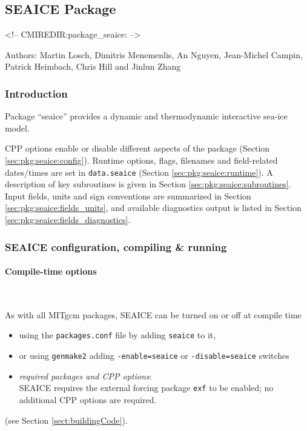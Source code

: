 


\subsection{SEAICE Package}
\label{sec:pkg:seaice}
\begin{rawhtml}
<!-- CMIREDIR:package_seaice: -->
\end{rawhtml}

Authors: Martin Losch, Dimitris Menemenlis, An Nguyen, Jean-Michel Campin,
Patrick Heimbach, Chris Hill and Jinlun Zhang

\subsubsection{Introduction
\label{sec:pkg:exf:intro}}


Package ``seaice'' provides a dynamic and thermodynamic interactive
sea-ice model. 

CPP options enable or disable different aspects of the package
(Section \ref{sec:pkg:seaice:config}).
Runtime options, flags, filenames and field-related dates/times are
set in \texttt{data.seaice}
(Section \ref{sec:pkg:seaice:runtime}).
A description of key subroutines is given in Section
\ref{sec:pkg:seaice:subroutines}.
Input fields, units and sign conventions are summarized in
Section \ref{sec:pkg:seaice:fields_units}, and available diagnostics
output is listed in Section \ref{sec:pkg:seaice:fields_diagnostics}.


\subsubsection{SEAICE configuration, compiling \& running}

\paragraph{Compile-time options
\label{sec:pkg:seaice:config}}
~

As with all MITgcm packages, SEAICE can be turned on or off at compile time
%
\begin{itemize}
%
\item
using the \texttt{packages.conf} file by adding \texttt{seaice} to it,
%
\item
or using \texttt{genmake2} adding
\texttt{-enable=seaice} or \texttt{-disable=seaice} switches
%
\item
\textit{required packages and CPP options}: \\
SEAICE requires the external forcing package \texttt{exf} to be enabled;
no additional CPP options are required.
%
\end{itemize}
(see Section \ref{sect:buildingCode}).

